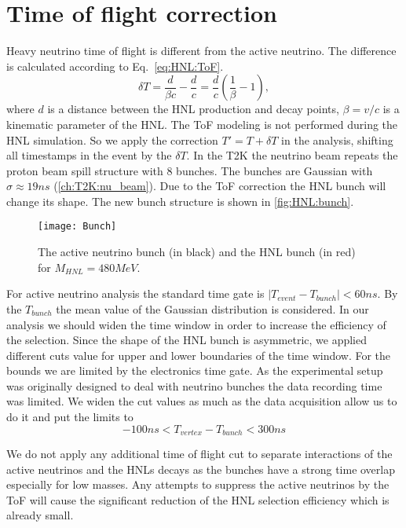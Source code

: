 \documentclass[../main.tex]{subfiles}
\begin{document}
\section{Time of flight correction}
\label{sec:HNL:tof_corr}
Heavy neutrino time of flight is different from the active neutrino. The difference is calculated according to Eq.~\ref{eq:HNL:ToF}.
\begin{equation}
  \delta T=\frac{d}{\beta c}-\frac{d}{c}=\frac{d}{c}\left(\frac{1}{\beta}-1\right),
  \label{eq:HNL:ToF}
\end{equation}
where $d$ is a distance between the HNL production and decay points, $\beta=v/c$ is a kinematic parameter of the HNL. The ToF modeling is not performed during the HNL simulation. So we apply the correction $T'=T+\delta T$ in the analysis, shifting all timestamps in the event by the $\delta T$. In the T2K the  neutrino beam repeats the proton beam spill structure with 8 bunches. The bunches are Gaussian with $\sigma\approx19ns$ (\autoref{ch:T2K:nu_beam}). Due to the ToF correction the HNL bunch will change its shape. The new bunch structure is shown in \autoref{fig:HNL:bunch}.
\begin{figure}[!ht]
  \begin{center}
  \texttt{[image: Bunch]}
  \caption{The active neutrino bunch (in black) and the HNL bunch (in red) for $M_{HNL}=480MeV$.}
  \label{fig:HNL:bunch}
  \end{center}
\end{figure}

For active neutrino analysis the standard time gate is $\left|T_{event}-T_{bunch}\right|<60ns$. By the $T_{bunch}$ the mean value of the Gaussian distribution is considered. In our analysis we should widen the time window in order to increase the efficiency of the selection. Since the shape of the HNL bunch is asymmetric, we applied different cuts value for upper and lower boundaries of the time window. For the bounds we are limited by the electronics time gate. As the experimental setup was originally designed to deal with neutrino bunches the data recording time was limited. We widen the cut values as much as the data acquisition allow us to do it and put the limits to
\begin{equation}
    -100ns<T_{vertex}-T_{bunch}<300ns
\end{equation}

We do not apply any additional time of flight cut to separate interactions of the active neutrinos and the HNLs decays as the bunches have a strong time overlap especially for low masses. Any attempts to suppress the active neutrinos by the ToF will cause the significant reduction of the HNL selection efficiency which is already small.
\end{document}

